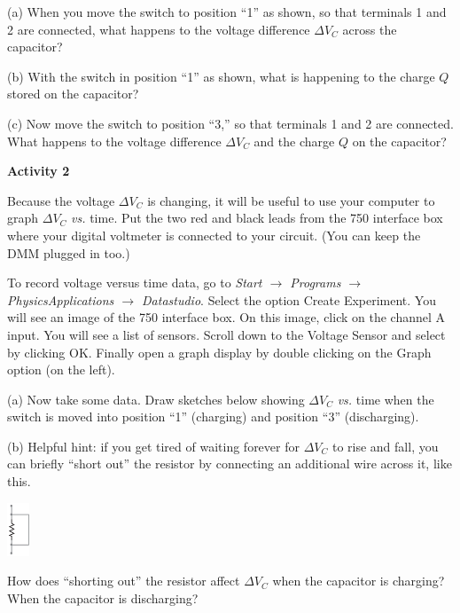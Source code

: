 (a) When you move the switch to position ``1'' as shown, so that terminals 1 and 2 are connected, what happens to the voltage difference $\Delta V_C$ across the capacitor?
\vspace{0.6in}

(b)  With the switch in position ``1'' as shown, what is happening to the charge $Q$ stored on the capacitor?
\vspace{0.6in}

(c)  Now move the switch to position ``3,'' so that terminals 1 and 2 are connected.  What happens to the voltage difference $\Delta V_C$ and the charge $Q$ on the capacitor?
\vspace{0.8in}

\pagebreak
\textbf{Activity 2}

Because the voltage $\Delta V_C$ is changing, it will be useful to use your computer to graph $\Delta V_C$ \textit{vs.} time.  Put the two red and black leads from the 750 interface box where your digital voltmeter is connected to your circuit.  (You can keep the DMM plugged in too.)

To record voltage versus time data, go to \textit{Start $\longrightarrow$ Programs $\longrightarrow$ PhysicsApplications $\longrightarrow$ Datastudio}. Select the option Create Experiment.  You will see an image of the 750 interface box.  On this image, click on the channel A input.  You will see a list of sensors.  Scroll down to the Voltage Sensor and select by clicking OK.  Finally open a graph display by double clicking on the Graph option (on the left).

(a)  Now take some data.  Draw sketches below showing $\Delta V_C$ \textit{vs.} time when the switch is moved into position ``1'' (charging) and position ``3'' (discharging).
\vspace{1.5in}

(b)  Helpful hint: if you get tired of waiting forever for $\Delta V_C$ to rise and fall, you can briefly “short out” the resistor by connecting an additional wire across it, like this.  
\begin{center}
\vspace{-0.2 in}
\includegraphics[width=0.05\textwidth]{rc_circuits/shorted_resistor_bw.eps}
\vspace{-0.2 in}
\end{center}
How does “shorting out” the resistor affect $\Delta V_C$ when the capacitor is charging?  When the capacitor is discharging?
\vspace{0.8in}


